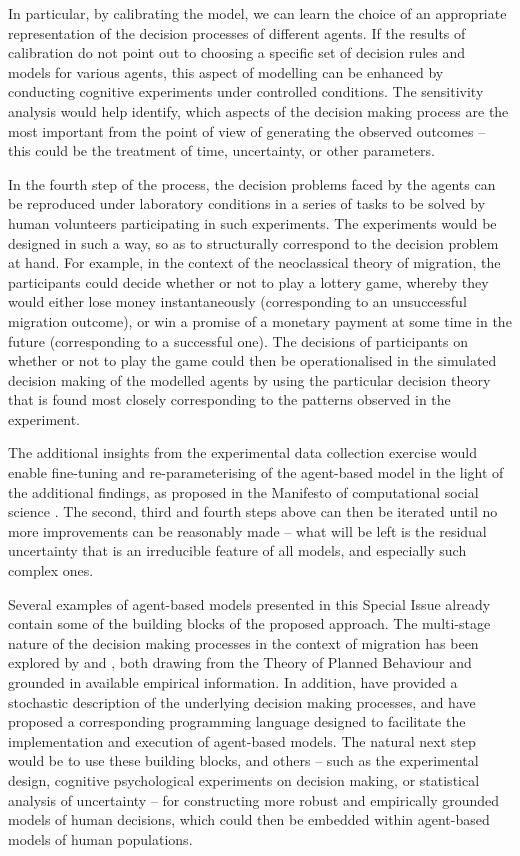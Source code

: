 \documentclass{article}
\begin{document}
In particular, by calibrating the model, we can learn the choice of an appropriate representation of the decision processes of different agents. If the results of calibration do not point out to choosing a specific set of decision rules and models for various agents, this aspect of modelling can be enhanced by conducting cognitive experiments under controlled conditions. The sensitivity analysis would help identify, which aspects of the decision making process are the most important from the point of view of generating the observed outcomes -- this could be the treatment of time, uncertainty, or other parameters. 

In the fourth step of the process, the decision problems faced by the agents can be reproduced under laboratory conditions in a series of tasks to be solved by human volunteers participating in such experiments. The experiments would be designed in such a way, so as to structurally correspond to the decision problem at hand. For example, in the context of the neoclassical theory of migration, the participants could decide whether or not to play a lottery game, whereby they would either lose money instantaneously (corresponding to an unsuccessful migration outcome), or win a promise of a monetary payment at some time in the future (corresponding to a successful one). The decisions of participants on whether or not to play the game could then be operationalised in the simulated decision making of the modelled agents by using the particular decision theory that is found most closely corresponding to the patterns observed in the experiment.

The additional insights from the experimental data collection exercise would enable fine-tuning and re-parameterising of the agent-based model in the light of the additional findings, as proposed in the Manifesto of computational social science \citep{Conte}. The second, third and fourth steps above can then be iterated until no more improvements can be reasonably made -- what will be left is the residual uncertainty that is an irreducible feature of all models, and especially such complex ones.

Several examples of agent-based models presented in this Special Issue already contain some of the building blocks of the proposed approach. The multi-stage nature of the decision making processes in the context of migration has been explored by \citet{Willekens2017} and \citet{Kley2017}, both drawing from the Theory of Planned Behaviour \citep{Ajzen1991} and grounded in available empirical information. In addition, \citet{Warnke2017} have provided a stochastic description of the underlying decision making processes, and have proposed a corresponding programming language designed to facilitate the implementation and execution of agent-based models. The natural next step would be to use these building blocks, and others -- such as the experimental design, cognitive psychological experiments on decision making, or statistical analysis of uncertainty -- for constructing more robust and empirically grounded models of human decisions, which could then be embedded within agent-based models of human populations. 
\end{document}
